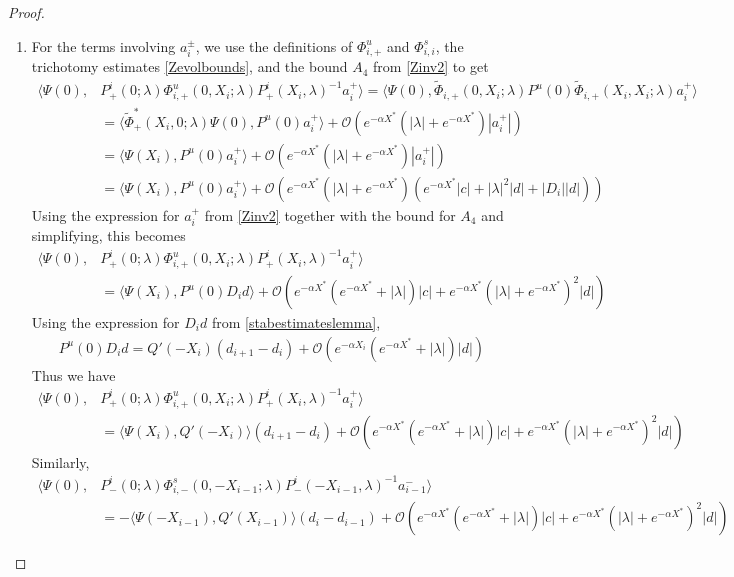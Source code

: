 \documentclass[thesis.tex]{subfiles}
\begin{document}
\begin{lemma}
\begin{proof}
\begin{enumerate}
\item For the terms involving $a_i^\pm$, we use the definitions of $\Phi^u_{i,+}$ and $\Phi^s_{i,i}$, the trichotomy estimates \cref{Zevolbounds}, and the bound $A_4$ from \cref{Zinv2} to get
\begin{align*}
\langle \Psi(0), &P^i_+(0; \lambda) \Phi^u_{i,+}(0, X_i; \lambda) P^i_+(X_i, \lambda)^{-1} a_i^+ \rangle = \langle \Psi(0), \tilde{\Phi}_{i,+}(0, X_i; \lambda) 
P^u(0) \tilde{\Phi}_{i,+}(X_i, X_i; \lambda)a_i^+ \rangle \\
&= \langle \tilde{\Phi}^*_+(X_i, 0; \lambda) \Psi(0), P^u(0) a_i^+ \rangle + \mathcal{O}(e^{-\alpha X^*}(|\lambda| + e^{-\alpha X^*})|a_i^+|) \\
&= \langle \Psi(X_i), P^u(0) a_i^+ \rangle + \mathcal{O}(e^{-\alpha X^*}(|\lambda| + e^{-\alpha X^*})|a_i^+|) \\
&= \langle \Psi(X_i), P^u(0) a_i^+ \rangle + \mathcal{O}\left(e^{-\alpha X^*}(|\lambda| + e^{-\alpha X^*}) \left( e^{-\alpha X^*} |c| + |\lambda|^2 |d| + |D_i||d| \right) \right)
\end{align*}
Using the expression for $a_i^+$ from \cref{Zinv2} together with the bound for $A_4$ and simplifying, this becomes
\begin{align*}
\langle \Psi(0), &P^i_+(0; \lambda) \Phi^u_{i,+}(0, X_i; \lambda) P^i_+(X_i, \lambda)^{-1} a_i^+ \rangle \\
&= \langle \Psi(X_i), P^u(0) D_i d \rangle + \mathcal{O}\left(e^{-\alpha X^*} (e^{-\alpha X^*} + |\lambda|)|c| + e^{-\alpha X^*}(|\lambda| + e^{-\alpha X^*})^2 |d|  \right)
\end{align*}
Using the expression for $D_i d$ from \cref{stabestimateslemma}, 
\begin{align*} 
P^u(0) D_i d = Q'(-X_i)(d_{i+1} - d_i ) + \mathcal{O}( e^{-\alpha X_i} (e^{-\alpha X^*} + |\lambda| )|d|)
\end{align*}
Thus we have
\begin{align*}
\langle \Psi(0), &P^i_+(0; \lambda) \Phi^u_{i,+}(0, X_i; \lambda) P^i_+(X_i, \lambda)^{-1} a_i^+ \rangle \\
&= \langle \Psi(X_i), Q'(-X_i) \rangle (d_{i+1} - d_i ) + \mathcal{O}\left(e^{-\alpha X^*} (e^{-\alpha X^*} + |\lambda|)|c| + e^{-\alpha X^*}(|\lambda| + e^{-\alpha X^*})^2 |d|  \right)
\end{align*}
Similarly,
\begin{align*}
\langle \Psi(0), &P^i_-(0; \lambda) \Phi^s_{i,-}(0, -X_{i-1}; \lambda) P^i_-(-X_{i-1}, \lambda)^{-1} a_{i-1}^- \rangle \\
&= -\langle \Psi(-X_{i-1}), Q'(X_{i-1}) \rangle (d_i - d_{i-1} )
+ \mathcal{O}\left(e^{-\alpha X^*} (e^{-\alpha X^*} + |\lambda|)|c| + e^{-\alpha X^*}(|\lambda| + e^{-\alpha X^*})^2 |d|  \right)
\end{align*}


\end{enumerate}
\end{proof}
\end{lemma}
\end{document}

